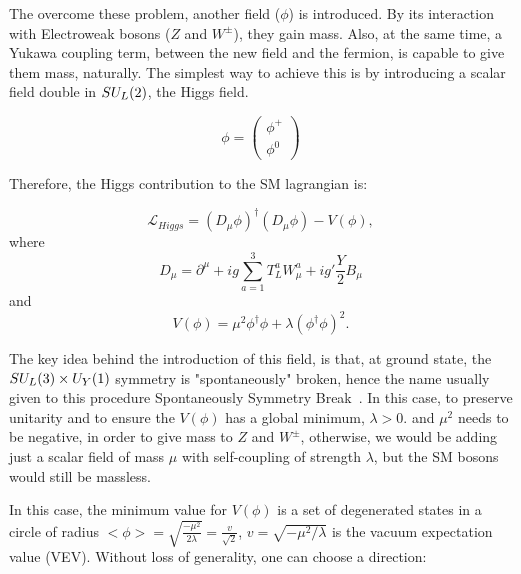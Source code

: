 The overcome these problem, another field ($\phi$) is introduced. By its interaction with Electroweak bosons ($Z$ and $W^\pm$), they gain mass. Also, at the same time, a Yukawa coupling term, between the new field and the fermion, is capable to give them mass, naturally. The simplest way to achieve this is by introducing a scalar field double in $SU_{\scaleto{L}{5pt}}(2)$, the Higgs field.

\begin{equation}
    \phi = 
        \left ( 
        \begin{matrix}
        \phi^+ \\
        \phi^0 
        \end{matrix}
        \right )
    \label{higgs_field}
\end{equation}

Therefore, the Higgs contribution to the SM lagrangian is:

\begin{equation}
    \mathcal{L}_{Higgs} = (D_\mu\phi)^\dagger(D_\mu\phi) - V(\phi),
    \label{higgs_field1}
\end{equation}
where
\begin{equation}
    D_\mu = \partial^\mu + ig \sum^3_{a=1} T_L^a W_\mu^a + ig'\frac{Y}{2}B_\mu
    \label{higgs_field2}
\end{equation}
and 
\begin{equation}
    V(\phi) = \mu^2 \phi^\dagger \phi + \lambda(\phi^\dagger \phi)^2.
    \label{higgs_field3}
\end{equation}

The key idea behind the introduction of this field, is that, at ground state, the $SU_{\scaleto{L}{5pt}}(3) \times U_{\scaleto{Y}{5pt}}(1)$ symmetry is "spontaneously" broken, hence the name usually given to this procedure Spontaneously Symmetry Break~\cite{Higgs:1964pj, Higgs:1964ia, Higgs:1966ev, Englert:1964et, Guralnik:1964eu, Kibble:1967sv}. In this case, to preserve unitarity and to ensure the $V(\phi)$ has a global minimum, $\lambda > 0$.  and $\mu^2$ needs to be negative, in order to give mass to $Z$ and $W^\pm$, otherwise, we would be adding just a scalar field of mass $\mu$ with self-coupling of strength $\lambda$, but the SM bosons would still be massless.

In this case, the minimum value for $V(\phi)$ is a set of degenerated states in a circle of radius $<\phi> = \sqrt{\frac{-\mu^2}{2\lambda}} = \frac{v}{\sqrt{2}}$, $v = \sqrt{-\mu^2/\lambda}$ is the vacuum expectation value (VEV). Without loss of generality, one can choose a direction:

